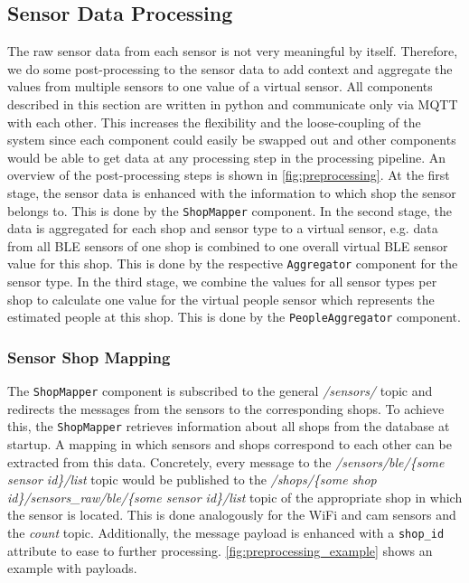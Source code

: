 \documentclass[runningheads]{llncs}
\newcommand{\attribute}[1]{\texttt{#1}}
\newcommand{\topicname}[1]{\textit{#1}}
\newcommand{\componentname}[1]{\texttt{#1}}
\begin{document}
\subsection{Sensor Data Processing}
\label{impl:sensor-processing}
The raw sensor data from each sensor is not very meaningful by itself. Therefore, we do some post-processing to the sensor data to add context and aggregate the values from multiple sensors to one value of a virtual sensor. All components described in this section are written in python and communicate only via MQTT with each other. This increases the flexibility and the loose-coupling of the system since each component could easily be swapped out and other components would be able to get data at any processing step in the processing pipeline. An overview of the post-processing steps is shown in \cref{fig:preprocessing}. At the first stage, the sensor data is enhanced with the information to which shop the sensor belongs to. This is done by the \componentname{ShopMapper} component. In the second stage, the data is aggregated for each shop and sensor type to a virtual sensor, e.g. data from all BLE sensors of one shop is combined to one overall virtual BLE sensor value for this shop. This is done by the respective \componentname{Aggregator} component for the sensor type. In the third stage, we combine the values for all sensor types per shop to calculate one value for the virtual people sensor which represents the estimated people at this shop. This is done by the \componentname{PeopleAggregator} component.


\subsubsection{Sensor Shop Mapping}
The \componentname{ShopMapper} component is subscribed to the general \topicname{/sensors/} topic and redirects the messages from the sensors to the corresponding shops. To achieve this, the \componentname{Shop\-Mapper} retrieves information about all shops from the database at startup. A mapping in which sensors and shops correspond to each other can be extracted from this data. Concretely, every message to the \topicname{/sensors/ble/\{some sensor id\}/list} topic would be published to the \topicname{/shops/\{some shop id\}/sensors\_raw\allowbreak/ble/\{some sensor id\}/list} topic of the appropriate shop in which the sensor is located. This is done analogously for the WiFi and cam sensors and the \topicname{count} topic. Additionally, the message payload is enhanced with a \attribute{shop\_id} attribute to ease to further processing. \cref{fig:preprocessing_example} shows an example with payloads.
\end{document}

